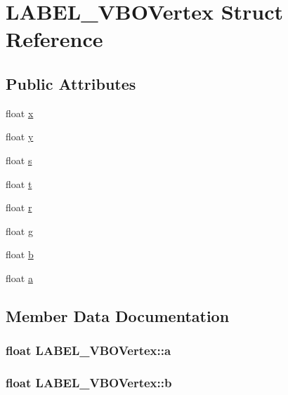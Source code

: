 \hypertarget{struct_l_a_b_e_l___v_b_o_vertex}{
\section{LABEL\_\-VBOVertex Struct Reference}
\label{struct_l_a_b_e_l___v_b_o_vertex}
}
\subsection*{Public Attributes}
\begin{CompactItemize}
\item 
float \hyperlink{struct_l_a_b_e_l___v_b_o_vertex_3b580240d67796b2a622ee62c0e0bedc}{x}
\item 
float \hyperlink{struct_l_a_b_e_l___v_b_o_vertex_e2ed3b0c3807f5e4e637a5d6b0873fbe}{y}
\item 
float \hyperlink{struct_l_a_b_e_l___v_b_o_vertex_74773708ccb389d3b401ba3ef8ef7469}{s}
\item 
float \hyperlink{struct_l_a_b_e_l___v_b_o_vertex_73bfe5f2b48d92f19418192ad5980b11}{t}
\item 
float \hyperlink{struct_l_a_b_e_l___v_b_o_vertex_4a83e942fe1bba54dc43f06676947eda}{r}
\item 
float \hyperlink{struct_l_a_b_e_l___v_b_o_vertex_f9cc2152986741b26c343940afa0a101}{g}
\item 
float \hyperlink{struct_l_a_b_e_l___v_b_o_vertex_39c64563e6b4d6cb486816484fef8ca8}{b}
\item 
float \hyperlink{struct_l_a_b_e_l___v_b_o_vertex_0182eeec1220d4ab29d7bb62680061b7}{a}
\end{CompactItemize}


\subsection{Member Data Documentation}
\hypertarget{struct_l_a_b_e_l___v_b_o_vertex_0182eeec1220d4ab29d7bb62680061b7}{
\subsubsection[{a}]{\setlength{\rightskip}{0pt plus 5cm}float {\bf LABEL\_\-VBOVertex::a}}}
\label{struct_l_a_b_e_l___v_b_o_vertex_0182eeec1220d4ab29d7bb62680061b7}


\hypertarget{struct_l_a_b_e_l___v_b_o_vertex_39c64563e6b4d6cb486816484fef8ca8}{
\subsubsection[{b}]{\setlength{\rightskip}{0pt plus 5cm}float {\bf LABEL\_\-VBOVertex::b}}}
\label{struct_l_a_b_e_l___v_b_o_vertex_39c64563e6b4d6cb486816484fef8ca8}


